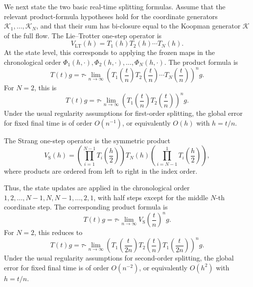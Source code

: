 \documentclass[preprint,1p,times,nopreprintline]{elsarticle}
\begin{document}
We next state the two basic real-time splitting formulas. Assume that the relevant product-formula hypotheses hold for the coordinate generators $\mathcal{K}_1,\ldots,\mathcal{K}_N$, and that their sum has bi-closure equal to the Koopman generator $\mathcal{K}$ of the full flow. The Lie--Trotter one-step operator is
\begin{equation}
\label{LTstep}
V_{\mathrm{LT}}(h)
=
T_1(h)T_2(h)\cdots T_N(h).
\end{equation}
At the state level, this corresponds to applying the frozen maps in the chronological order $\Phi_1(h,\cdot), \Phi_2(h,\cdot), \ldots, \Phi_N(h,\cdot)$. The product formula is
\begin{equation}
\label{LTH}
T(t)g
=
\tau\text{-}\lim_{n\to\infty}
\left(
T_1\!\left(\frac{t}{n}\right)
T_2\!\left(\frac{t}{n}\right)
\cdots
T_N\!\left(\frac{t}{n}\right)
\right)^n g .
\end{equation}
For $N=2$, this is
\begin{equation}
\label{LT}
T(t)g
=
\tau\text{-}\lim_{n\to\infty}
\left(
T_1\!\left(\frac{t}{n}\right)
T_2\!\left(\frac{t}{n}\right)
\right)^n g .
\end{equation}
Under the usual regularity assumptions for first-order splitting, the global error for fixed final time is of order $O(n^{-1})$, or equivalently $O(h)$ with $h=t/n$.

The Strang one-step operator is the symmetric product
\begin{equation}
\label{SPHstep}
V_{\mathrm{S}}(h)
=
\left(\prod_{i=1}^{N-1} T_i\!\left(\frac{h}{2}\right)\right)
T_N(h)
\left(\prod_{i=N-1}^{1} T_i\!\left(\frac{h}{2}\right)\right),
\end{equation}
where products are ordered from left to right in the index order.

Thus, the state updates are applied in the chronological order $1,2,\ldots,N-1,N,N-1,\ldots,2,1$, with half steps except for the middle $N$-th coordinate step. The corresponding product formula is
\begin{equation}
\label{SPH}
T(t)g
=
\tau\text{-}\lim_{n\to\infty}
V_{\mathrm{S}}\!\left(\frac{t}{n}\right)^n g .
\end{equation}
For $N=2$, this reduces to
\begin{equation}
\label{SP}
T(t)g
=
\tau\text{-}\lim_{n\to\infty}
\left(
T_1\!\left(\frac{t}{2n}\right)
T_2\!\left(\frac{t}{n}\right)
T_1\!\left(\frac{t}{2n}\right)
\right)^n g .
\end{equation}
Under the usual regularity assumptions for second-order splitting, the global error for fixed final time is of order $O(n^{-2})$, or equivalently $O(h^2)$ with $h=t/n$.
\end{document}
